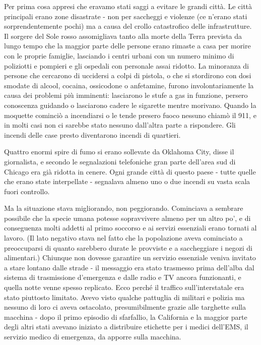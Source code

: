 Per prima cosa appresi che eravamo stati saggi a evitare le grandi
città. Le città principali erano zone disastrate - non per saccheggi e
violenze (ce n'erano stati sorprendentemente pochi) ma a causa del
crollo catastrofico delle infrastrutture. Il sorgere del Sole rosso
assomigliava tanto alla morte della Terra prevista da lungo tempo che la
maggior parte delle persone erano rimaste a casa per morire con le
proprie famiglie, lasciando i centri urbani con un numero minimo di
poliziotti e pompieri e gli ospedali con personale assai ridotto. La
minoranza di persone che cercarono di uccidersi a colpi di pistola, o
che si stordirono con dosi smodate di alcool, cocaina, ossicodone o
anfetamine, furono involontariamente la causa dei problemi più
imminenti: lasciarono le stufe a gas in funzione, persero conoscenza
guidando o lasciarono cadere le sigarette mentre morivano. Quando la
moquette cominciò a incendiarsi o le tende presero fuoco nessuno chiamò
il 911, e in molti casi non ci sarebbe stato nessuno dall'altra parte a
rispondere. Gli incendi delle case presto diventarono incendi di
quartieri.

Quattro enormi spire di fumo si erano sollevate da Oklahoma City, disse
il giornalista, e secondo le segnalazioni telefoniche gran parte
dell'area sud di Chicago era già ridotta in cenere. Ogni grande città di
questo paese - tutte quelle che erano state interpellate - segnalava
almeno uno o due incendi su vasta scala fuori controllo.

Ma la situazione stava migliorando, non peggiorando. Cominciava a
sembrare possibile che la specie umana potesse sopravvivere almeno per
un altro po', e di conseguenza molti addetti al primo soccorso e ai
servizi essenziali erano tornati al lavoro. (Il lato negativo stava nel
fatto che la popolazione aveva cominciato a preoccuparsi di quanto
sarebbero durate le provviste e a saccheggiare i negozi di alimentari.)
Chiunque non dovesse garantire un servizio essenziale veniva invitato a
stare lontano dalle strade - il messaggio era stato trasmesso prima
dell'alba dal sistema di trasmissione d'emergenza e dalle radio e TV
ancora funzionanti, e quella notte venne spesso replicato. Ecco perché
il traffico sull'interstatale era stato piuttosto limitato. Avevo visto
qualche pattuglia di militari e polizia ma nessuno di loro ci aveva
ostacolato, presumibilmente grazie alle targhette sulla macchina - dopo
il primo episodio di sfarfallio, la California e la maggior parte degli
altri stati avevano iniziato a distribuire etichette per i medici
dell'EMS, il servizio medico di emergenza, da apporre sulla macchina.

